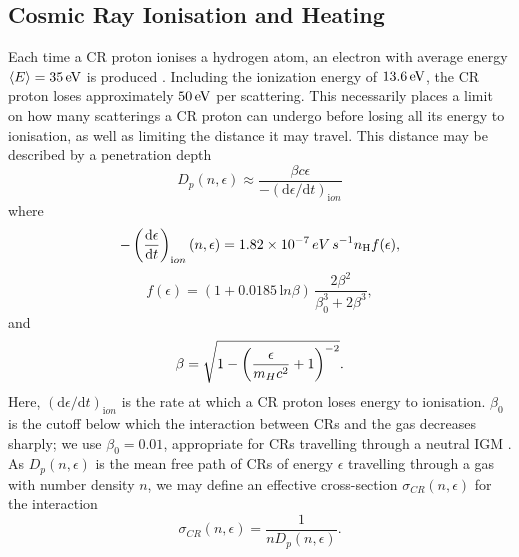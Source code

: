 \documentclass[../thesis.tex]{subfiles}
\begin{document}
\subsection{Cosmic Ray Ionisation and Heating}
\label{CRchem}

Each time a CR proton ionises a hydrogen atom, an electron with average energy $\langle E \rangle = 35\,\mathrm{eV}$ is produced \citep{SpitzerTomasko1968}.  
Including the ionization energy of $13.6\,\mathrm{eV}$, the CR proton loses approximately $50\,\mathrm{eV}$ per scattering. 
This necessarily places a limit on how many scatterings a CR proton can undergo before losing all its energy to ionisation, as well as limiting the distance it may travel.  
This distance may be described by a penetration depth 
\begin{equation}
    D_p(n, \epsilon) \approx \frac{\beta c \epsilon} {-({\mathrm d}\epsilon / {\mathrm d}t)_{\mathrm ion}}
\end{equation}
where \citep{Schlickeiser2002}
\begin{equation}
    - \left( \frac{{\mathrm d}\epsilon} {{\mathrm d}t} \right)_{\mathrm ion}(n, \epsilon)
    = 1.82\times10^{-7}\,{\mathrm \small eV\,s}^{-1} n_{\mathrm{H}} f(\epsilon),
\end{equation}
\begin{equation}    
    f(\epsilon) = (1 + 0.0185 \,{\mathrm ln}\beta )\, \frac{2 \beta^2}{\beta_0^3 + 2 \beta^3},
\end{equation}
and 
\begin{equation}
    \beta =  \sqrt{1 - \left( \frac{\epsilon}{m_{\mathrm \tiny H}c^2}+1 \right)^{-2}}.
\end{equation}
Here, $({\mathrm d}\epsilon / {\mathrm d}t)_{\mathrm ion}$ is the rate at which a CR proton loses energy to ionisation. 
$\beta_0$ is the cutoff below which the interaction between CRs and the gas decreases sharply; we use $\beta_0=0.01$, appropriate for CRs travelling through a neutral IGM \citep{StacyBromm2007}.
As $D_p(n, \epsilon)$ is the mean free path of CRs of energy $\epsilon$ travelling through a gas with number density $n$, we may define an effective cross-section $\sigma_{CR}(n,\epsilon)$ for the interaction
\begin{equation}
\sigma_{CR}(n,\epsilon) = \frac{1}{n D_p(n, \epsilon)}.
\end{equation}
\end{document}
